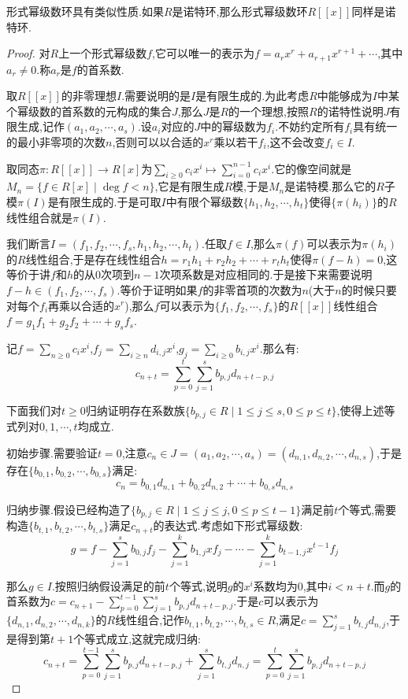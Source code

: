 形式幂级数环具有类似性质.如果$R$是诺特环,那么形式幂级数环$R[[x]]$同样是诺特环.
\begin{proof}

对$R$上一个形式幂级数$f$,它可以唯一的表示为$f=a_rx^r+a_{r+1}x^{r+1}+\cdots$,其中$a_r\not=0$.称$a_r$是$f$的首系数.

取$R[[x]]$的非零理想$I$.需要说明的是$I$是有限生成的.为此考虑$R$中能够成为$I$中某个幂级数的首系数的元构成的集合$J$,那么$J$是$R$的一个理想,按照$R$的诺特性说明$J$有限生成,记作$(a_1,a_2,\cdots,a_s)$.设$a_i$对应的$J$中的幂级数为$f_i$.不妨约定所有$f_i$具有统一的最小非零项的次数$n$,否则可以以合适的$x^r$乘以若干$f_i$,这不会改变$f_i\in I$.

取同态$\pi:R[[x]]\to R[x]$为$\sum_{i\ge0}c_ix^i\mapsto\sum_{i=0}^{n-1}c_ix^i$.它的像空间就是$M_n=\{f\in R[x]\mid\deg f<n\}$,它是有限生成$R$模,于是$M_n$是诺特模.那么它的$R$子模$\pi(I)$是有限生成的.于是可取$I$中有限个幂级数$\{h_1,h_2,\cdots,h_t\}$使得$\{\pi(h_i)\}$的$R$线性组合就是$\pi(I)$.

我们断言$I=(f_1,f_2,\cdots,f_s,h_1,h_2,\cdots,h_t)$.任取$f\in I$,那么$\pi(f)$可以表示为$\pi(h_i)$的$R$线性组合,于是存在线性组合$h=r_1h_1+r_2h_2+\cdots+r_th_t$使得$\pi(f-h)=0$,这等价于讲$f$和$h$的从0次项到$n-1$次项系数是对应相同的.于是接下来需要说明$f-h\in(f_1,f_2,\cdots,f_s)$.等价于证明如果$f$的非零首项的次数为$n$(大于$n$的时候只要对每个$f_i$再乘以合适的$x^r$),那么$f$可以表示为$\{f_1,f_2,\cdots,f_s\}$的$R[[x]]$线性组合$f=g_1f_1+g_2f_2+\cdots+g_sf_s$.

记$f=\sum_{n\ge0}c_ix^i$,$f_j=\sum_{i\ge n}d_{i,j}x^i$,$g_j=\sum_{i\ge0}b_{i,j}x^i$.那么有:
$$c_{n+t}=\sum_{p=0}^t\sum_{j=1}^sb_{p,j}d_{n+t-p,j}$$

下面我们对$t\ge0$归纳证明存在系数族$\{b_{p,j}\in R\mid 1\le j\le s,0\le p\le t\}$,使得上述等式列对$0,1,\cdots,t$均成立.

初始步骤.需要验证$t=0$,注意$c_n\in J=(a_1,a_2,\cdots,a_s)=(d_{n,1},d_{n,2},\cdots,d_{n,s})$,于是存在$\{b_{0,1},b_{0,2},\cdots,b_{0,s}\}$满足:
$$c_n=b_{0,1}d_{n,1}+b_{0,2}d_{n,2}+\cdots+b_{0,s}d_{n,s}$$

归纳步骤.假设已经构造了$\{b_{p,j}\in R\mid 1\le j\le j,0\le p\le t-1\}$满足前$t$个等式,需要构造$\{b_{t,1},b_{t,2},\cdots,b_{t,s}\}$满足$c_{n+t}$的表达式.考虑如下形式幂级数:
$$g=f-\sum_{j=1}^sb_{0,j}f_j-\sum_{j=1}^kb_{1,j}xf_j-\cdots-\sum_{j=1}^kb_{t-1,j}x^{t-1}f_j$$

那么$g\in I$.按照归纳假设满足的前$t$个等式,说明$g$的$x^i$系数均为0,其中$i<n+t$.而$g$的首系数为$c=c_{n+1}-\sum_{p=0}^{t-1}\sum_{j=1}^sb_{p,j}d_{n+t-p,j}$.于是$c$可以表示为$\{d_{n,1},d_{n,2},\cdots,d_{n,k}\}$的$R$线性组合,记作$b_{t,1},b_{t,2},\cdots,b_{t,s}\in R$,满足$c=\sum_{j=1}^sb_{t,j}d_{n,j}$,于是得到第$t+1$个等式成立,这就完成归纳:
$$c_{n+t}=\sum_{p=0}^{t-1}\sum_{j=1}^sb_{p,j}d_{n+t-p,j}+\sum_{j=1}^sb_{t,j}d_{n,j}=\sum_{p=0}^{t}\sum_{j=1}^sb_{p,j}d_{n+t-p,j}$$
\end{proof}
